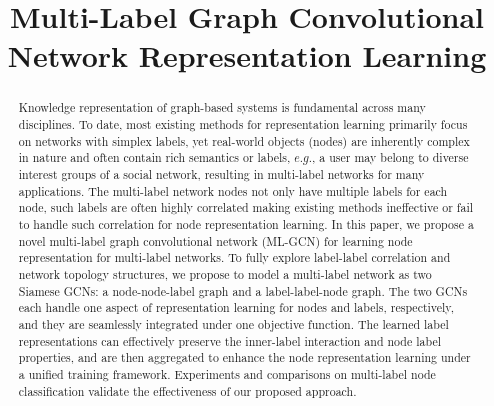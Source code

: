 \documentclass[conference]{IEEEtran}
\begin{document}
\title{Multi-Label Graph Convolutional Network Representation Learning}

\author{
}

\maketitle

\begin{abstract}
Knowledge representation of graph-based systems is fundamental across many disciplines. To date, most existing methods for representation learning primarily focus on networks with simplex labels, yet real-world objects (nodes) are inherently complex in nature and often contain rich semantics or labels, $e.g.$, a user may belong to diverse interest groups of a social network, resulting in multi-label networks for many applications. The multi-label network nodes not only have multiple labels for each node, such labels are often highly correlated making existing methods ineffective or fail to handle such correlation for node representation learning. In this paper, we propose a novel multi-label graph convolutional network (ML-GCN) for learning node representation for multi-label networks. To fully explore label-label correlation and network topology structures, we propose to model a multi-label network as two Siamese GCNs: a node-node-label graph and a label-label-node graph. The two GCNs each handle one aspect of representation learning for nodes and labels, respectively, and they are seamlessly integrated under one objective function. The learned label representations can effectively preserve the inner-label interaction and node label properties, and are then aggregated to enhance the node representation learning under a unified training framework. Experiments and comparisons on multi-label node classification validate the effectiveness of our proposed approach.

\end{abstract}
\end{document}
